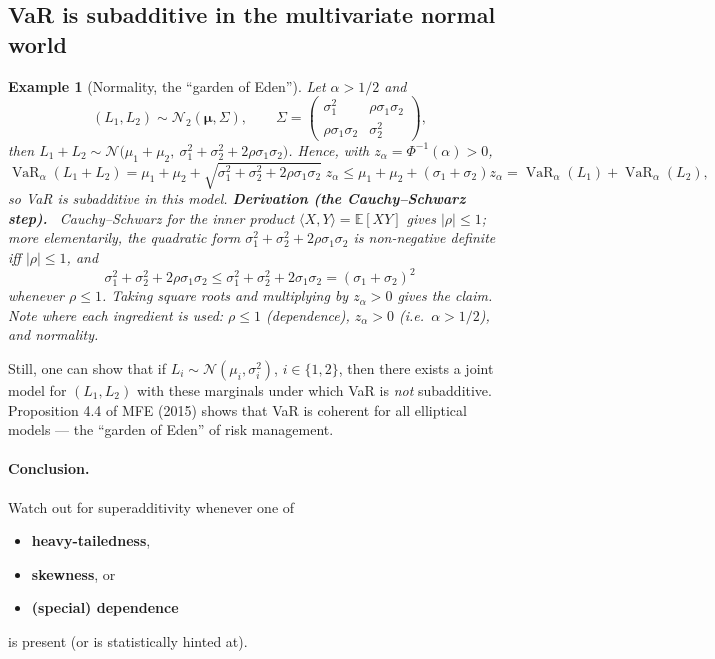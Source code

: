 \documentclass[11pt,a4paper]{article}
\newtheorem{example}{Example}
\newcommand{\VaR}{\operatorname{VaR}}
\newcommand{\E}{\mathbb{E}}
\newcommand{\N}{\mathcal{N}}
\newcommand{\der}[1]{\medskip\noindent\textbf{Derivation (#1).}\ }
\begin{document}
\subsection{VaR is subadditive in the multivariate normal world}
\begin{example}[Normality, the ``garden of Eden'']
Let $\alpha>1/2$ and
\[
  (L_1,L_2)\sim \N_2(\boldsymbol\mu,\Sigma),\qquad
  \Sigma=\begin{pmatrix}\sigma_1^2&\rho\sigma_1\sigma_2\\ \rho\sigma_1\sigma_2&\sigma_2^2\end{pmatrix},
\]
then $L_1+L_2\sim\N\big(\mu_1+\mu_2,\ \sigma_1^2+\sigma_2^2+2\rho\sigma_1\sigma_2\big)$. Hence, with
$z_\alpha=\Phi^{-1}(\alpha)>0$,
\[
  \VaR_\alpha(L_1+L_2)=\mu_1+\mu_2+\sqrt{\sigma_1^2+\sigma_2^2+2\rho\sigma_1\sigma_2}\;z_\alpha
  \le\mu_1+\mu_2+(\sigma_1+\sigma_2)z_\alpha=\VaR_\alpha(L_1)+\VaR_\alpha(L_2),
\]
so VaR is subadditive in this model.
\der{the Cauchy--Schwarz step}
Cauchy--Schwarz for the inner product $\langle X,Y\rangle=\E[XY]$ gives $|\rho|\le1$; more
elementarily, the quadratic form $\sigma_1^2+\sigma_2^2+2\rho\sigma_1\sigma_2$ is non-negative
definite iff $|\rho|\le1$, and
\[
  \sigma_1^2+\sigma_2^2+2\rho\sigma_1\sigma_2\le\sigma_1^2+\sigma_2^2+2\sigma_1\sigma_2
  =(\sigma_1+\sigma_2)^2
\]
whenever $\rho\le1$. Taking square roots and multiplying by $z_\alpha>0$ gives the claim. Note where
each ingredient is used: $\rho\le1$ (dependence), $z_\alpha>0$ (i.e.\ $\alpha>1/2$), and normality.
\end{example}

Still, one can show that if $L_i\sim\N(\mu_i,\sigma_i^2)$, $i\in\{1,2\}$, then there exists a joint
model for $(L_1,L_2)$ with these marginals under which VaR is \emph{not} subadditive.
Proposition 4.4 of MFE (2015) shows that VaR is coherent for all elliptical models --- the ``garden of
Eden'' of risk management.

\paragraph{Conclusion.} Watch out for superadditivity whenever one of
\begin{itemize}[nosep]
  \item \textbf{heavy-tailedness},
  \item \textbf{skewness}, or
  \item \textbf{(special) dependence}
\end{itemize}
is present (or is statistically hinted at).
\end{document}
